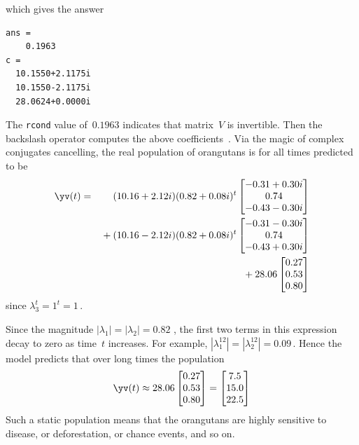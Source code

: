 \begin{example}
\begin{solution}
\begin{itemize}
which gives the answer
\begin{verbatim}
ans =
    0.1963
c =
  10.1550+2.1175i
  10.1550-2.1175i
  28.0624+0.0000i
\end{verbatim}
The \verb|rcond| value of~\(0.1963\) indicates that matrix~\(V\) is invertible.
Then the backslash operator computes the above coefficients~\cv.
Via the magic of complex conjugates cancelling, the real population of orangutans is for all times predicted to be \twodp
\begin{eqnarray*}
\yv(t)&=&(10.16+2.12i)(0.82+0.08i)^t\begin{bmatrix} -0.31+0.30i   \\0.74
\\-0.43-0.30i \end{bmatrix}
\\&&{}
+(10.16-2.12i)(0.82+0.08i)^t\begin{bmatrix} -0.31-0.30i   \\0.74
\\-0.43+0.30i \end{bmatrix}
\\&&{}
+28.06\begin{bmatrix} 0.27
\\0.53
\\0.80 \end{bmatrix}
\end{eqnarray*}
since \(\lambda_3^t=1^t=1\)\,.

Since the magnitude \(|\lambda_1|=|\lambda_2|=0.82\) \twodp, 
the first two terms in this expression decay to zero as time~\(t\) increases.
For example, \(|\lambda_1^{12}|=|\lambda_2^{12}|=0.09\)\,.
Hence the model predicts that over long times the population
\begin{equation*}
\yv(t)\approx 28.06\begin{bmatrix} 0.27
\\0.53
\\0.80 \end{bmatrix}
=\begin{bmatrix} 7.5\\15.0\\22.5 \end{bmatrix}
\end{equation*}
Such a static population means that the orangutans are highly sensitive to disease, or deforestation, or chance events, and so on.


\end{itemize}
\end{solution}
\end{example}
